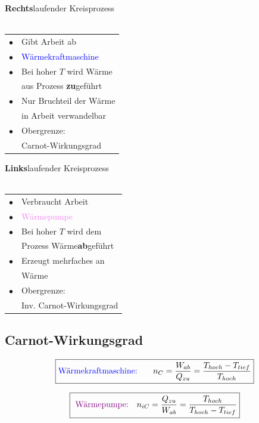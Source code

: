 \begin{minipage}{0.48\linewidth}
\textbf{Rechts}laufender Kreisprozess \\
\\
\begin{tabular}{ll}
$\bullet$ & Gibt Arbeit ab\\
$\bullet$ & \textcolor{blue}{Wärmekraftmaschine} \\
$\bullet$ & Bei hoher $T$ wird Wärme  \\
		  & aus Prozess \textbf{zu}geführt\\
$\bullet$ & Nur Bruchteil der Wärme \\
		  & in Arbeit verwandelbar \\
$\bullet$ & Obergrenze: \\
		  & Carnot-Wirkungsgrad\\

\end{tabular}
\end{minipage}
\hfill
\begin{minipage}{0.48\linewidth}
\textbf{Links}laufender Kreisprozess \\
\\
\begin{tabular}{ll}
$\bullet$ & Verbraucht Arbeit \\
$\bullet$ & \textcolor{violet}{Wärmepumpe} \\
$\bullet$ & Bei hoher $T$ wird dem \\
		  & Prozess Wärme\textbf{ab}geführt\\
$\bullet$ & Erzeugt mehrfaches an \\
		  & Wärme \\
$\bullet$ & Obergrenze: \\
		  & Inv. Carnot-Wirkungsgrad \\
\end{tabular}
\end{minipage}








\subsection{Carnot-Wirkungsgrad}


$$ \boxed{\text{\textcolor{blue}{Wärmekraftmaschine: } }  \quad n_C = \frac{W_{ab}}{Q_{zu}} = \frac{T_{hoch}-T_{tief}}{T_{hoch}} }  $$


$$ \boxed{\text{ \textcolor{violet}{Wärmepumpe:}} \quad  n_{iC} = \frac{Q_{zu}}{W_{ab}} = \frac{T_{hoch}}{T_{hoch}-T_{tief}} }  $$



